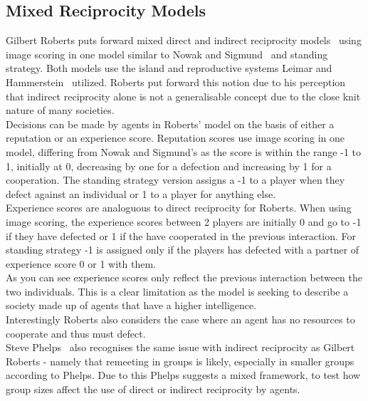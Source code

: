\documentclass[twoside,twocolumn]{article}
\begin{document}
\subsection{Mixed Reciprocity Models}
Gilbert Roberts puts forward mixed direct and indirect reciprocity models~\cite{evoldirindir} using image scoring in one model similar to Nowak and Sigmund~\cite{evol_indirect_image} and standing strategy. Both models use the island and reproductive systems Leimar and Hammerstein~\cite{leimarhammer} utilized. Roberts put forward this notion due to his perception that indirect reciprocity alone is not a generalisable concept due to the close knit nature of many societies.\\
Decisions can be made by agents in Roberts' model on the basis of either a reputation or an experience score. Reputation scores use image scoring in one model, differing from Nowak and Sigmund's as the score is within the range -1 to 1, initially at 0, decreasing by one for a defection and increasing by 1 for a cooperation. The standing strategy version assigns a -1 to a player when they defect against an individual or 1 to a player for anything else.\\
Experience scores are analoguous to direct reciprocity for Roberts. When using image scoring, the experience scores between 2 players are initially 0 and go to -1 if they have defected or 1 if the have cooperated in the previous interaction. For standing strategy -1 is assigned only if the players has defected with a partner of experience score 0 or 1 with them.\\
As you can see experience scores only reflect the previous interaction between the two individuals. This is a clear limitation as the model is seeking to describe a society made up of agents that have a higher intelligence.\\
Interestingly Roberts also considers the case where an agent has no resources to cooperate and thus must defect.\\
Steve Phelps~\cite{phelps_game_theoretic_analysis} also recognises the same issue with indirect reciprocity as Gilbert Roberts - namely that remeeting in groups is likely, especially in smaller groups according to Phelps. Due to this Phelps suggests a mixed framework, to test how group sizes affect the use of direct or indirect reciprocity by agents.
 
\end{document}
